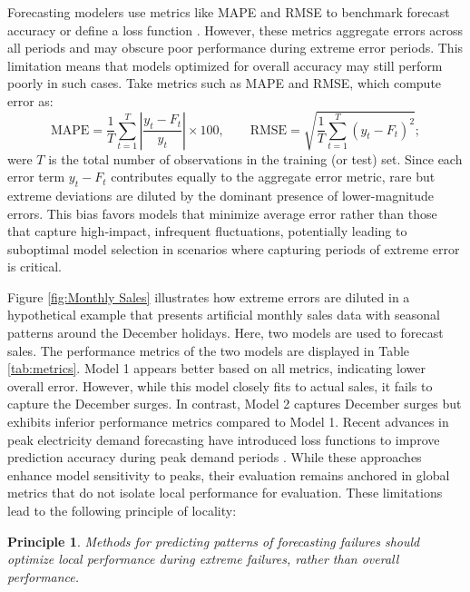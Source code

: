 \documentclass[preprint,12pt]{elsarticle}
\newtheorem{principle}{Principle}
\begin{document}
Forecasting modelers use metrics like MAPE and RMSE to benchmark forecast accuracy or define a loss function \citep{petropoulos2022}. However, these metrics aggregate errors across all periods and may obscure poor performance during extreme error periods. This limitation means that models optimized for overall accuracy may still perform poorly in such cases. Take metrics such as MAPE and RMSE, which compute error as:
\begin{equation}
\text{MAPE} = \frac{1}{T} \sum_{t=1}^{T} \left| \frac{y_t - F_t}{y_t} \right| \times 100,
\qquad
\text{RMSE} = \sqrt{\frac{1}{T} \sum_{t=1}^{T} (y_t - F_t)^2};
\end{equation}
were $T$ is the total number of observations in the training (or test) set. Since each error term $y_t - F_t$ contributes equally to the aggregate error metric, rare but extreme deviations 
are diluted by the dominant presence of lower-magnitude errors. This bias favors models that minimize average error rather than those that capture high-impact, infrequent fluctuations, potentially leading to suboptimal model selection in scenarios where capturing periods of extreme error is critical.

Figure \ref{fig:Monthly Sales} illustrates how extreme errors are diluted in a hypothetical example that presents artificial monthly sales data with seasonal patterns around the December holidays. Here, two models are used to forecast sales. The performance metrics of the two models are displayed in Table \ref{tab:metrics}. Model 1 appears better based on all metrics, indicating lower overall error. However, while this model closely fits to actual sales, it fails to capture the December surges. In contrast, Model 2 captures  December surges but exhibits inferior performance metrics compared to Model 1.  Recent advances in peak electricity demand forecasting have introduced loss functions to improve prediction accuracy during peak demand periods \citep{nygard2025}. While these approaches enhance model sensitivity to peaks, their evaluation remains anchored in global metrics that do not isolate local performance for evaluation.  These limitations lead to the following principle of locality:

\begin{principle}\label{principle:local_performance}
\textit{Methods for predicting patterns of forecasting failures should optimize local performance during extreme failures, rather than overall performance.}
\end{principle}
\end{document}

